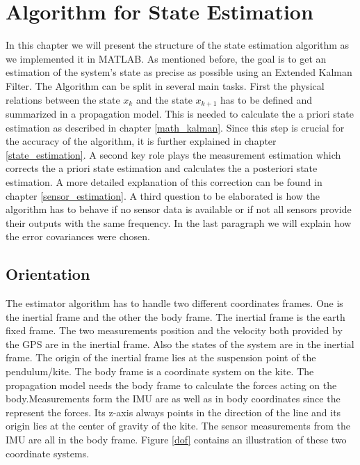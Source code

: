 \section{Algorithm for State Estimation}
In this chapter we will present the structure of the state estimation algorithm as we implemented it in MATLAB. As mentioned before, the goal is to get an estimation of the system's state as precise as possible using an Extended Kalman Filter. The Algorithm can be split in several main tasks. First the physical relations between the state $x_{k}$ and the state $x_{k+1}$ has to be defined and summarized in a propagation model. This is needed to calculate the a priori state estimation as described in chapter \ref{math_kalman}. Since this step is  crucial for the accuracy of the algorithm, it is further explained in chapter \ref{state_estimation}. A second key role plays the measurement estimation which corrects the a priori state estimation and calculates the a posteriori state estimation. A more detailed explanation of this correction can be found in chapter \ref{sensor_estimation}. A third question to be elaborated is how the algorithm has to behave if no sensor data is available or if not all sensors provide their outputs with the same frequency. In the last paragraph we will explain how the error covariances were chosen.

\subsection*{Orientation}
The estimator algorithm has to handle two different coordinates frames. One is the inertial frame and the other the body frame. The inertial frame is the earth fixed frame. The two measurements position and the velocity both provided by the GPS are in the inertial frame. Also the states of the system are in the inertial frame. The origin of the inertial frame lies at the suspension point of the pendulum/kite. The body frame is a coordinate system on the kite. The propagation model needs the body frame to calculate the forces acting on the body.Measurements form the IMU are as well as in body coordinates since the represent the forces. Its z-axis always points in the direction of the line and its origin lies at the center of gravity of the kite. The sensor measurements from the IMU are all in the body frame. Figure \ref{dof} contains an illustration of these two coordinate systems. 

